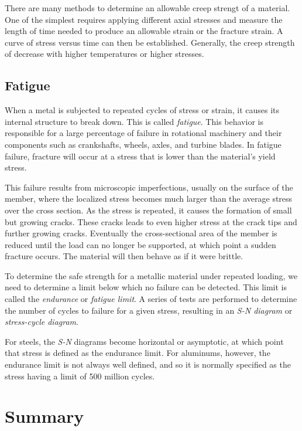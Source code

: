 \documentclass[
fontsize=10pt,
a4paper,
twosides=false,
open=any,
svgnames,
]{kaobook} %
\begin{document}
There are many methods to determine an allowable creep strengt of a material. One of the simplest requires applying different axial stresses and measure the length of time needed to produce an allowable strain or the fracture strain. A curve of stress versus time can then be established. Generally, the creep strength of decrease with higher temperatures or higher stresses.


\subsection{Fatigue}

When a metal is subjected to repeated cycles of stress or strain, it causes its internal structure to break down. This is called \emph{fatigue}. This behavior is responsible for a large percentage of failure in rotational machinery and their components such as crankshafts, wheels, axles, and turbine blades. In fatigue failure, fracture will occur at a stress that is lower than the material's yield stress.

This failure results from microscopic imperfections, usually on the surface of the member, where the localized stress becomes much larger than the average stress over the cross section. As the stress is repeated, it causes the formation of small but growing cracks. These cracks leads to even higher stress at the crack tips and further growing cracks. Eventually the cross-sectional area of the member is reduced until the load can no longer be supported, at which point a sudden fracture occurs. The material will then behave as if it were brittle.

To determine the safe strength for a metallic material under repeated loading, we need to determine a limit below which no failure can be detected. This limit is called the \emph{endurance} or \emph{fatigue limit}. A series of tests are performed to determine the number of cycles to failure for a given stress, resulting in an \emph{S-N diagram} or \emph{stress-cycle diagram}.

For steels, the \emph{S-N} diagrams become horizontal or asymptotic, at which point that stress is defined as the endurance limit. For aluminums, however, the endurance limit is not always well defined, and so it is normally specified as the stress having a limit of 500 million cycles. \cite{hibbeler2013}

\section*{Summary}
\end{document}
